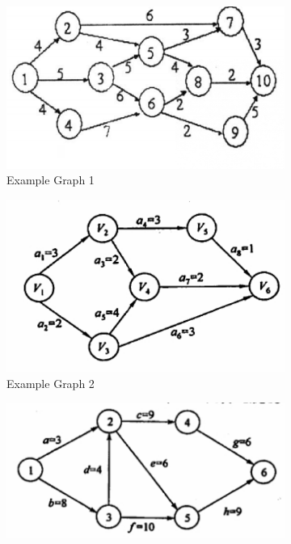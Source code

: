 \documentclass[UTF8]{ctexart}
\begin{document}
\begin{figure}[htbp]
  \centering
  \begin{subfigure}{0.3\textwidth}
      \centering
      \includegraphics[width=\linewidth]{example1.png}
      \caption{Example Graph 1}
  \end{subfigure}%
  \hfill
  \begin{subfigure}{0.3\textwidth}
      \centering
      \includegraphics[width=\linewidth]{example2.png}
      \caption{Example Graph 2}
  \end{subfigure}%
  \hfill
  \begin{subfigure}{0.3\textwidth}
      \centering
      \includegraphics[width=1.2\linewidth]{example3.png}

\end{subfigure}
\end{figure}
\end{document}
